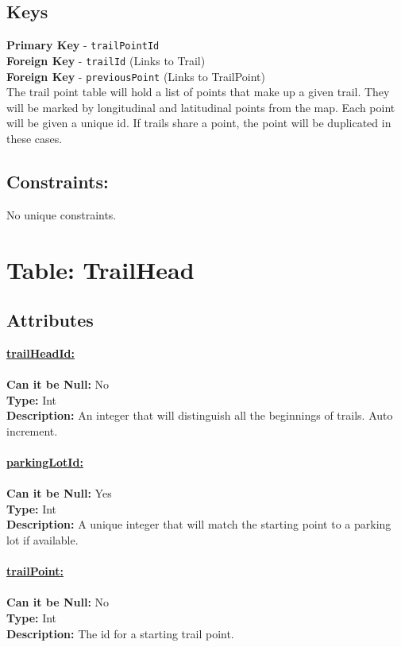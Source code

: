 \subsection{Keys}
\textbf{Primary Key} - \texttt{trailPointId}\\
\textbf{Foreign Key} - \texttt{trailId} (Links to Trail)\\
\textbf{Foreign Key} - \texttt{previousPoint} (Links to TrailPoint)\\
The trail point table will hold a list of points that make up 
a given trail. They will be marked by longitudinal and latitudinal
points from the map. Each point will be given a unique id. If trails
share a point, the point will be duplicated in these cases.

\subsection{Constraints:}
No unique constraints.



\newpage
\section{Table: TrailHead}
\subsection{Attributes}
\textbf{\underline{trailHeadId:}}\\
\\
\textbf{Can it be Null:} No\\
\textbf{Type:} Int\\
\textbf{Description:}
An integer that will distinguish all the beginnings of trails. Auto increment.\\\\
\textbf{\underline{parkingLotId:}}\\
\\
\textbf{Can it be Null:} Yes\\
\textbf{Type:} Int\\
\textbf{Description:}
A unique integer that will match the starting point to a 
parking lot if available. \\\\
\textbf{\underline{trailPoint:}}\\ %
\\
\textbf{Can it be Null:} No\\
\textbf{Type:} Int\\
\textbf{Description:}
The id for a starting trail point.\\\\

